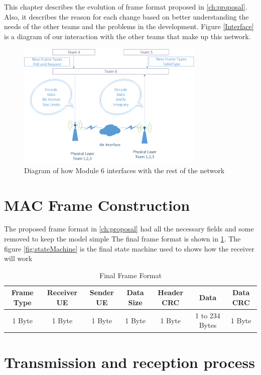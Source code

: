 This chapter describes the evolution of frame format proposed in \ref{ch:proposal}. Also, it describes the reason for each change based on better understanding the needs of the other teams and the problems in the development. Figure \ref{Interface} is a diagram of our interaction with the other teams that make up this network. 
\begin{figure}[ht]
    \centering
    \includegraphics[width=0.8\textwidth]{Interface_diagram.PNG}
    \caption{Diagram of how Module 6 interfaces with the rest of the network}
    \label{fig:Interface}
\end{figure}


\section{MAC Frame Construction}
The proposed frame format in \ref{ch:proposal} had all the necessary fields and some removed to keep the model simple
The final frame format is  shown in \ref{tab:finalFrame}.
The figure \ref{fig:stateMachine} is the final state machine used to shows how the receiver will work

\begin{table}
\begin{tabular}{| c | c | c | c | c | c | c | }
  \hline                       
  Frame Type & Receiver UE & Sender UE & Data Size & Header CRC & Data & Data CRC\\
  \hline
	1 Byte & 1 Byte & 1 Byte & 1 Byte & 1 Byte & 1 to 234 Bytes & 1 Byte\\
  
  \hline  
\end{tabular}
 \caption{Final Frame Format}
	\label{tab:finalFrame}
\end{table}

\section{Transmission and reception process}

